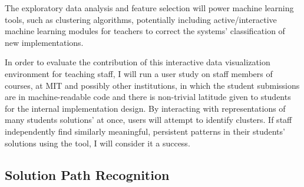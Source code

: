 \documentclass[12pt]{article}
\begin{document}
The exploratory data analysis and feature selection will power machine learning tools, such as clustering algorithms, potentially including active/interactive machine learning modules for teachers to correct the systems' classification of new implementations. 

In order to evaluate the contribution of this interactive data visualization environment for teaching staff, I will run a user study on staff members of courses, at MIT and possibly other institutions, in which the student submissions are in machine-readable code and there is non-trivial latitude given to students for the internal implementation design. By interacting with representations of many students solutions' at once, users will attempt to identify clusters. If staff independently find similarly meaningful, persistent patterns in their students' solutions using the tool, I will consider it a success.

\subsection{Solution Path Recognition}



\end{document}
